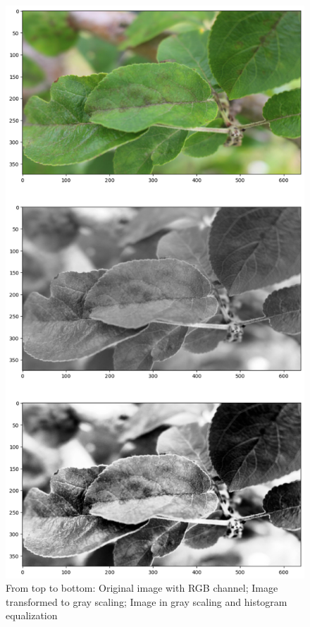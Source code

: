 \documentclass[12pt, a4paper]{article}
\begin{document}
	\begin{figure}[!ht]
	\centering
	\includegraphics[scale=0.4]{pic_1.png}
	\caption{From top to bottom: Original image with RGB channel; Image transformed to gray scaling; Image in gray scaling and histogram equalization}
	\label{pic:cmp_leaf}
	\end{figure}
	
\end{document}
